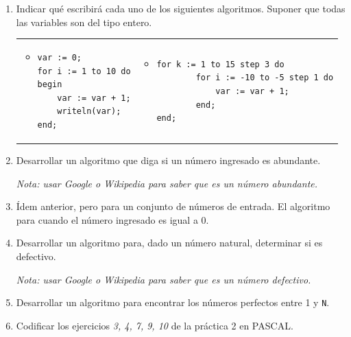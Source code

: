\documentclass[a4paper,10pt]{article}
\begin{document}
\begin{enumerate}
\item Indicar qu\'e escribir\'a cada uno de los siguientes algoritmos. Suponer que todas las variables son del tipo entero.

\begin{tabular}{p{} p{} }
    \begin{itemize}
        \item[a-]
\begin{verbatim}
var := 0;
for i := 1 to 10 do
begin
    var := var + 1;
    writeln(var);
end;
\end{verbatim}
    \end{itemize}
&
    \begin{itemize}
        \item[b-]
\begin{verbatim}
for k := 1 to 15 step 3 do
        for i := -10 to -5 step 1 do
            var := var + 1;
        end;
end;
\end{verbatim}
    \end{itemize}
\\
\end{tabular}

\item Desarrollar un algoritmo que diga si un n\'umero ingresado es abundante.\\
	\begin{small} \emph{Nota: usar Google o Wikipedia para saber que es un n\'umero abundante.} \end{small}

\item \'Idem anterior, pero para un conjunto de n\'umeros de entrada. El algoritmo para cuando el n\'umero ingresado es igual a 0.

\item Desarrollar un algoritmo para, dado un n\'umero natural, determinar si es defectivo.
	\begin{small} \emph{Nota: usar Google o Wikipedia para saber que es un n\'umero defectivo.} \end{small}

\item Desarrollar un algoritmo para encontrar los n\'umeros perfectos entre 1 y \verb=N=.

\item Codificar los ejercicios \emph{3, 4, 7, 9, 10} de la pr\'actica 2 en PASCAL.

\end{enumerate}
\end{document}
